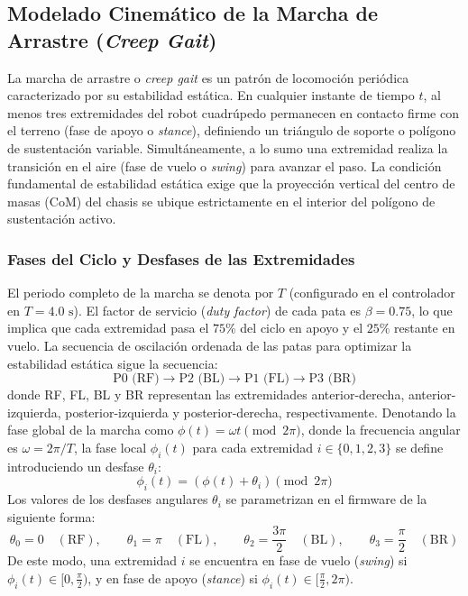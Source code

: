 
\subsection{Modelado Cinemático de la Marcha de Arrastre (\textit{Creep Gait})}
\label{subsec:creep_gait_kinematics}

La marcha de arrastre o \textit{creep gait} es un patrón de locomoción periódica caracterizado por su estabilidad estática. En cualquier instante de tiempo $t$, al menos tres extremidades del robot cuadrúpedo permanecen en contacto firme con el terreno (fase de apoyo o \textit{stance}), definiendo un triángulo de soporte o polígono de sustentación variable. Simultáneamente, a lo sumo una extremidad realiza la transición en el aire (fase de vuelo o \textit{swing}) para avanzar el paso. La condición fundamental de estabilidad estática exige que la proyección vertical del centro de masas (CoM) del chasis se ubique estrictamente en el interior del polígono de sustentación activo.

\subsubsection{Fases del Ciclo y Desfases de las Extremidades}

El periodo completo de la marcha se denota por $T$ (configurado en el controlador en $T = 4.0\text{ s}$). El factor de servicio (\textit{duty factor}) de cada pata es $\beta = 0.75$, lo que implica que cada extremidad pasa el $75\%$ del ciclo en apoyo y el $25\%$ restante en vuelo. La secuencia de oscilación ordenada de las patas para optimizar la estabilidad estática sigue la secuencia:
\begin{equation}
    \text{P0 (RF)} \longrightarrow \text{P2 (BL)} \longrightarrow \text{P1 (FL)} \longrightarrow \text{P3 (BR)}
\end{equation}
donde RF, FL, BL y BR representan las extremidades anterior-derecha, anterior-izquierda, posterior-izquierda y posterior-derecha, respectivamente. Denotando la fase global de la marcha como $\phi(t) = \omega t \pmod{2\pi}$, donde la frecuencia angular es $\omega = 2\pi / T$, la fase local $\phi_i(t)$ para cada extremidad $i \in \{0, 1, 2, 3\}$ se define introduciendo un desfase $\theta_i$:
\begin{equation}
    \phi_i(t) = (\phi(t) + \theta_i) \pmod{2\pi}
\end{equation}
Los valores de los desfases angulares $\theta_i$ se parametrizan en el firmware de la siguiente forma:
\begin{equation}
    \theta_0 = 0 \quad (\text{RF}), \qquad \theta_1 = \pi \quad (\text{FL}), \qquad \theta_2 = \frac{3\pi}{2} \quad (\text{BL}), \qquad \theta_3 = \frac{\pi}{2} \quad (\text{BR})
\end{equation}
De este modo, una extremidad $i$ se encuentra en fase de vuelo (\textit{swing}) si $\phi_i(t) \in [0, \frac{\pi}{2})$, y en fase de apoyo (\textit{stance}) si $\phi_i(t) \in [\frac{\pi}{2}, 2\pi)$.

